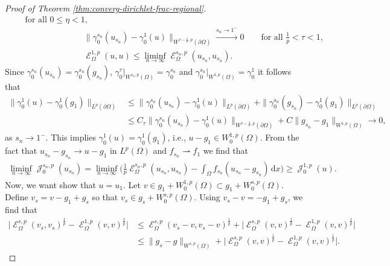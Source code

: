 \documentclass[10pt,a4paper]{amsart}
\DeclareMathOperator{\cE}{\mathcal{E}}
\DeclareMathOperator{\cJ}{\mathcal{J}}
\renewcommand{\d}{\,\mathrm{d}}
\begin{document}
\begin{proof}[Proof of Theorem \ref{thm:converg-dirichlet-frac-regional}]
\begin{align*}
\qquad\text{for all $0\leq \eta<1$}, \\
&\|\gamma^{s_n}_0(u_{s_n}) -\gamma^1_0(u)\|_{W^{\tau-\frac{1}{p},p}(\partial\Omega)}\xrightarrow{s_n\to 1^-}0\qquad\text{for all $\frac1{p} <\tau<1$},\\
&\cE^{1,p}_\Omega(u,u) \leq \liminf_{n\to\infty}\cE^{s_n,p}_\Omega(u_{s_n}, u_{s_n}).
\end{align*}
Since $\gamma^{s_n}_0 (u_{s_n})= \gamma^{s_n}_0(g_{s_n})$,  $ \gamma^{\tau}_0|_{W^{s_n,p}(\Omega)}=\gamma^{s_n}_0$ and $\gamma^{s_n}_0|_{W^{1,p}(\Omega)}= \gamma^{1}_0$  it follows that
\begin{align*}
\|\gamma^1_0(u)-\gamma^1_0(g_1)\|_{L^{p}(\partial\Omega)}
&\leq \|\gamma^{s_n}_0(u_{s_n}) -\gamma^1_0(u)\|_{L^{p}(\partial\Omega)}
+ \|\gamma^{s_n}_0(g_{s_n}) -\gamma^1_0( g_1)\|_{L^{p}(\partial\Omega)}\\
&\leq C_\tau \|\gamma^{s_n}_0(u_{s_n}) -\gamma^1_0(u)\|_{W^{\tau-\frac{1}{p},p}(\partial\Omega)}
+ C\|g_{s_n}- g_1\|_{W^{1,p}(\Omega)}
\to0,
\end{align*}
as $s_n\to 1^-$. This implies $\gamma^1_0(u)= \gamma^1_0(g_1)$, i.e., $u-g_1\in W^{1,p}_0(\Omega)$.
 From the fact that  $u_{s_n}-g_{s_n}\to u-g_{1}$ in $L^p(\Omega)$ and $f_{s_n}\rightharpoonup f_1 $ we find that
\begin{align*}
\liminf_{n\to\infty}\cJ_0^{s_n,p}(u_{s_n})= \liminf_{n\to\infty}\big(\tfrac{1}{p} \cE_\Omega^{s_n,p}(u_{s_n},u_{s_n} )-\int_\Omega f_{s_n}(u_{s_n}-g_{s_n})\d x \big) \geq  \cJ^{1,p}_0(u).
\end{align*}
Now, we want show that $u=u_1$.  Let $v\in g_1+W^{1,p}_0(\Omega)\subset g_1+W^{s,p}_0(\Omega)$. Define $v_s=v-g_1+g_s$ so that $v_s\in g_s+ W^{s,p}_0(\Omega)$. Using $v_s-v=-g_1+g_s$, we find that
\begin{align*}
\big|\cE^{s,p}_\Omega(v_s,v_s)^{\frac{1}{p}}-\cE^{1,p}_\Omega(v,v)^{\frac{1}{p}}\big|
&\leq \cE^{s,p}_\Omega(v_s-v,v_s-v)^{\frac{1}{p}}+ \big|\cE^{s,p}_\Omega(v,v)^{\frac{1}{p}}-\cE^{1,p}_\Omega(v,v)^{\frac{1}{p}}\big|\\
&\leq  \|g_s-g\|_{W^{s,p}(\Omega)}+ \big|\cE^{s,p}_\Omega(v,v)^{\frac{1}{p}}-\cE^{1,p}_\Omega(v,v)^{\frac{1}{p}}\big|.
\end{align*}

\end{proof}
\end{document}
